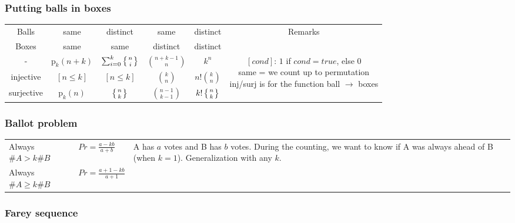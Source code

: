 \documentclass[landscape,a4paper,twocolumn,10pt]{report}
\begin{document}
\subsubsection*{Putting balls in boxes}

\begin{center}
\begin{tabular}{@{}c|c|c|c|c||c@{}}
Balls & same & distinct & same & distinct & \multirow{2}{*}{Remarks} \\
Boxes & same & same & distinct & distinct & \\
\hline
-          & $\mathrm{p}_k(n+k)$ & $\sum_{i=0}^k \left\{{n\atop i}\right\}$ & $\binom{n+k-1}{n}$ & $k^n$ &
\multirow{3}{*}{\parbox[t]{5cm}{$[cond]$: $1$ if $cond=true$, else $0$ \\ same = we count up to permutation \\ inj/surj is for the function ball $\to$ boxes}} \\
injective  & $[n \le k]$         & $[n \le k]$                              & $\binom{k}{n}$     & $n!\binom{k}{n}$ & \\
surjective & $\mathrm{p}_k(n)$   & $\left\{{n\atop k}\right\}$              & $\binom{n-1}{k-1}$ & $k!\left\{{n\atop k}\right\}$ & \\
\end{tabular}
\end{center}

\subsubsection*{Ballot problem}

\begin{center}
\begin{tabular}{@{}ll||l@{}}
Always $\#A > k\#B$ & $Pr=\frac{a-kb}{a+b}$ &
\multirow{2}{*}{\parbox[t]{7cm}{A has $a$ votes and B has $b$ votes. During the counting, we want to know if A was always ahead of B (when $k=1$). Generalization with any $k$.}} \\
Always $\#A \ge k\#B$ & $Pr=\frac{a+1-kb}{a+1}$ & \\
\end{tabular}
\end{center}

\subsubsection*{Farey sequence}
\end{document}
